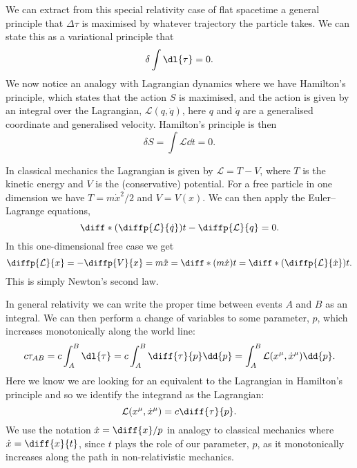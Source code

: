 \documentclass[fleqn]{NotesClass}
\newcommand*{\lagrangian}{\mathcal{L}}
\begin{document}
    We can extract from this special relativity case of flat spacetime a general principle that \(\Delta \tau\) is maximised by whatever trajectory the particle takes.
    We can state this as a variational principle that
    \begin{equation}
        \delta \int \dl{\tau} = 0.
    \end{equation}
    We now notice an analogy with Lagrangian dynamics where we have Hamilton's principle, which states that the action \(S\) is maximised, and the action is given by an integral over the Lagrangian, \(\lagrangian(q, \dot{q})\), here \(q\) and \(\dot{q}\) are a generalised coordinate and generalised velocity.
    Hamilton's principle is then
    \begin{equation}
        \delta S = \int \lagrangian \dd{t} = 0.
    \end{equation}
    
    In classical mechanics the Lagrangian is given by \(\lagrangian = T - V\), where \(T\) is the kinetic energy and \(V\) is the (conservative) potential.
    For a free particle in one dimension we have \(T = m\dot{x}^2/2\) and \(V = V(x)\).
    We can then apply the Euler--Lagrange equations,
    \begin{equation}
        \diff*{\left( \diffp{\lagrangian}{\dot{q}} \right)}{t} - \diffp{\lagrangian}{q} = 0.
    \end{equation}
    In this one-dimensional free case we get
    \begin{equation}
        \diffp{\lagrangian}{x} =  -\diffp{V}{x} = m\ddot{x} = \diff*{(m\dot{x})}{t} = \diff*{\left( \diffp{\lagrangian}{\dot{x}} \right)}{t}.
    \end{equation}
    This is simply Newton's second law.
    
    In general relativity we can write the proper time between events \(A\) and \(B\) as an integral.
    We can then perform a change of variables to some parameter, \(p\), which increases monotonically along the world line:
    \begin{equation}
        c\tau_{AB} = c\int_{A}^{B} \dl{\tau} = c\int_{A}^{B} \diff{\tau}{p}\dd{p} = \int_{A}^{B} \lagrangian(x^\mu, \dot{x}^\mu) \dd{p}.
    \end{equation}
    Here we know we are looking for an equivalent to the Lagrangian in Hamilton's principle and so we identify the integrand as the Lagrangian:
    \begin{equation}
        \lagrangian(x^\mu, \dot{x}^\mu) = c\diff{\tau}{p}.
    \end{equation}
    We use the notation \(\dot{x} = \diff{x}/{p}\) in analogy to classical mechanics where \(\dot{x} = \diff{x}{t}\), since \(t\) plays the role of our parameter, \(p\), as it monotonically increases along the path in non-relativistic mechanics.
    
\end{document}

